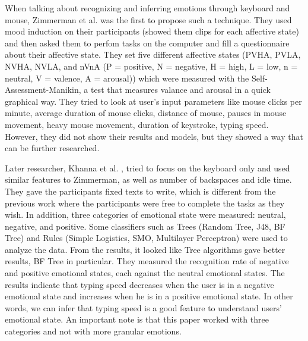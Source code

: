 \documentclass[../main.tex]{subfiles}
\begin{document}
When talking about recognizing and inferring 
emotions through keyboard and mouse, Zimmerman et al.\cite{Zimmermann} was the first 
to propose such a technique. They used mood induction on their participants 
(showed them clips for each affective state) and then asked them to perfom tasks on 
the computer and fill a questionnaire about their affective state. They set five 
different affective states (PVHA, PVLA, NVHA, NVLA, and nVnA (P = positive, N = negative, 
H = high, L = low, n = neutral, V = valence, A = arousal)) which were measured with the 
Self-Assessment-Manikin, a test that measures valance and arousal in a quick graphical way. 
They tried to look at user’s input parameters like mouse clicks per minute, average 
duration of mouse clicks, distance of mouse, pauses in mouse movement, heavy mouse movement, 
duration of keystroke, typing speed. However, they did not show their results and models, 
but they showed a way that can be further researched.
\par

Later researcher, Khanna et al. \cite{Khanna}, tried to focus on the keyboard only and used 
similar features to Zimmerman, as well as number of backspaces and idle time. 
They gave the participants fixed texts to write, which is different from the previous work 
where the participants were free to complete the tasks as they wish. In addition, three categories of 
emotional state were measured: neutral, negative, and positive. Some classifiers such as Trees 
(Random Tree, J48, BF Tree) and Rules (Simple Logistics, SMO, Multilayer Perceptron) were used to 
analyze the data. From the results, it looked like Tree algorithms gave better results, BF Tree in 
particular. They measured the recognition rate of negative and positive emotional states, 
each against the neutral emotional states. The results indicate that typing speed decreases when 
the user is in a negative emotional state and increases when he is in a positive emotional state. 
In other words, we can infer that typing speed is a good feature to understand users' emotional state. 
An important note is that this paper worked with three categories and not with more granular emotions.
\par
\end{document}
